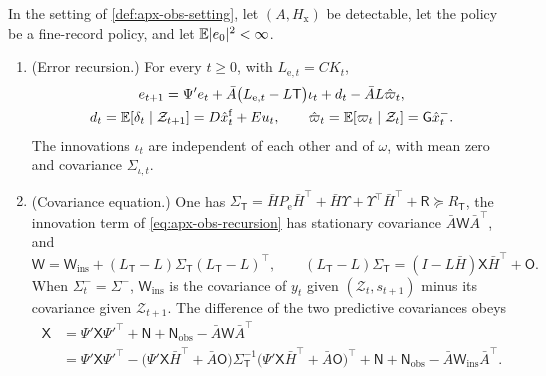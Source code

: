 \begin{theorem}\label{thm:apx-obs}
In the setting of \cref{def:apx-obs-setting}, let $(A,H_{\mathrm x})$ be detectable, let the policy be a fine-record policy, and let $\mathbb{E}\lvert e_0\rvert^2<\infty$.
\begin{enumerate}
\item[(a)] (Error recursion.) For every $t\ge0$, with $L_{\mathrm e,t}=CK_t$,
\begin{equation}\label{eq:apx-obs-recursion}
\begin{gathered}
e_{t+1}=\Psi'e_t+\bar A\bigl(L_{\mathrm e,t}-L\mathsf T\bigr)\iota_t+d_t-\bar AL\hat\varpi_t,\\
d_t=\mathbb{E}[\delta_t\mid\mathcal Z_{t+1}]=D\hat x^{\mathrm f}_t+Eu_t,\qquad\hat\varpi_t=\mathbb{E}[\varpi_t\mid\mathcal Z_t]=\mathsf G\hat x^-_t .
\end{gathered}
\end{equation}
The innovations $\iota_t$ are independent of each other and of $\omega$, with mean zero and covariance $\Sigma_{\iota,t}$.
\item[(b)] (Covariance equation.) One has $\Sigma_{\mathsf T}=\bar HP_{\mathrm e}\bar H^\top+\bar H\Upsilon+\Upsilon^\top\bar H^\top+\mathsf R\succeq R_{\mathsf T}$, the innovation term of \eqref{eq:apx-obs-recursion} has stationary covariance $\bar A\mathsf W\bar A^\top$, and
\begin{equation}\label{eq:apx-obs-split}
\mathsf W=\mathsf W_{\mathrm{ins}}+(L_{\mathsf T}-L)\Sigma_{\mathsf T}(L_{\mathsf T}-L)^\top,\qquad(L_{\mathsf T}-L)\Sigma_{\mathsf T}=(I-L\bar H)\mathsf X\bar H^\top+\mathsf O .
\end{equation}
When $\Sigma^-_t=\Sigma^-$, $\mathsf W_{\mathrm{ins}}$ is the covariance of $y_t$ given $(\mathcal Z_t,s_{t+1})$ minus its covariance given $\mathcal Z_{t+1}$. The difference of the two predictive covariances obeys
\begin{equation}\label{eq:apx-obs-quadratic}
\begin{aligned}
\mathsf X&=\Psi'\mathsf X\Psi'^\top+\mathsf N+\mathsf N_{\mathrm{obs}}-\bar A\mathsf W\bar A^\top\\
&=\Psi'\mathsf X\Psi'^\top-\bigl(\Psi'\mathsf X\bar H^\top+\bar A\mathsf O\bigr)\Sigma_{\mathsf T}^{-1}\bigl(\Psi'\mathsf X\bar H^\top+\bar A\mathsf O\bigr)^\top+\mathsf N+\mathsf N_{\mathrm{obs}}-\bar A\mathsf W_{\mathrm{ins}}\bar A^\top .
\end{aligned}
\end{equation}

\end{enumerate}
\end{theorem}
